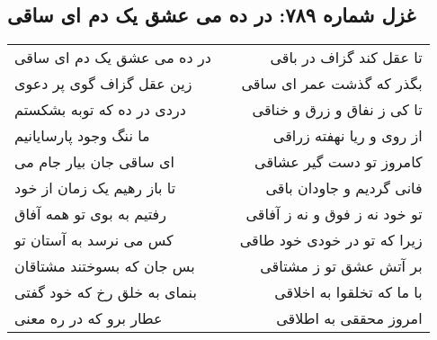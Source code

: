 \begin{center}
\section*{غزل شماره ۷۸۹: در ده می عشق یک دم ای ساقی}
\label{sec:789}
\begin{longtable}{l p{0.5cm} r}
در ده می عشق یک دم ای ساقی
&&
تا عقل کند گزاف در باقی
\\
زین عقل گزاف گوی پر دعوی
&&
بگذر که گذشت عمر ای ساقی
\\
دردی در ده که توبه بشکستم
&&
تا کی ز نفاق و زرق و خناقی
\\
ما ننگ وجود پارسایانیم
&&
از روی و ریا نهفته زراقی
\\
ای ساقی جان بیار جام می
&&
کامروز تو دست گیر عشاقی
\\
تا باز رهیم یک زمان از خود
&&
فانی گردیم و جاودان باقی
\\
رفتیم به بوی تو همه آفاق
&&
تو خود نه ز فوق و نه ز آفاقی
\\
کس می نرسد به آستان تو
&&
زیرا که تو در خودی خود طاقی
\\
بس جان که بسوختند مشتاقان
&&
بر آتش عشق تو ز مشتاقی
\\
بنمای به خلق رخ که خود گفتی
&&
با ما که تخلقوا به اخلاقی
\\
عطار برو که در ره معنی
&&
امروز محققی به اطلاقی
\\
\end{longtable}
\end{center}

